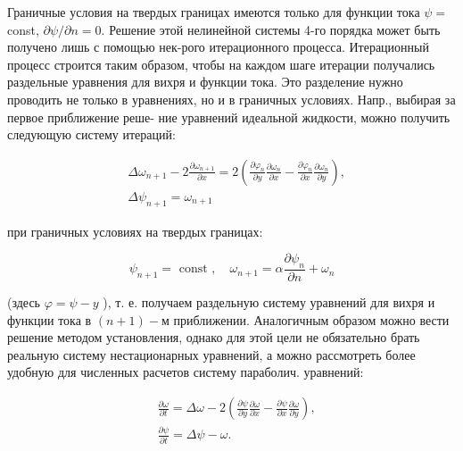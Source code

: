 \documentclass[10pt]{article}
\begin{document}
Граничные условия на твердых границах имеются только для функции тока $\psi=$ const, $\partial \psi / \partial n=0$. Решение этой нелинейной системы 4-го порядка может быть получено лишь с помощью нек-рого итерационного процесса. Итерационный процесс строится таким образом, чтобы на каждом шаге итерации получались раздельные уравнения для вихря и функции тока. Это разделение нужно проводить не только в уравнениях, но и в граничных условиях. Напр., выбирая за первое приближение реше- ние уравнений идеальной жидкости, можно получить следующую систему итераций:



\[

\begin{aligned}

& \Delta \omega_{n+1}-2 \frac{\partial \omega_{n+1}}{\partial x}=2\left(\frac{\partial \varphi_{n}}{\partial y} \frac{\partial \omega_{n}}{\partial x}-\frac{\partial \varphi_{n}}{\partial x} \frac{\partial \omega_{n}}{\partial y}\right), \\

& \Delta \psi_{n+1}=\omega_{n+1}

\end{aligned}

\]



при граничных условиях на твердых границах:



\[

\psi_{n+1}=\text { const }, \quad \omega_{n+1}=\alpha \frac{\partial \psi_{n}}{\partial n}+\omega_{n}

\]



(здесь $\varphi=\psi-y$ ), т. е. получаем раздельную систему уравнений для вихря и функции тока в $(n+1)-м$ приближении. Аналогичным образом можно вести решение методом установления, однако для этой цели не обязательно брать реальную систему нестационарных уравнений, а можно рассмотреть более удобную для численных расчетов систему параболич. уравнений:



\[

\begin{aligned}

& \frac{\partial \omega}{\partial t}=\Delta \omega-2\left(\frac{\partial \psi}{\partial y} \frac{\partial \omega}{\partial x}-\frac{\partial \psi}{\partial x} \frac{\partial \omega}{\partial y}\right), \\

& \frac{\partial \psi}{\partial t}=\Delta \psi-\omega .

\end{aligned}

\]
\end{document}
